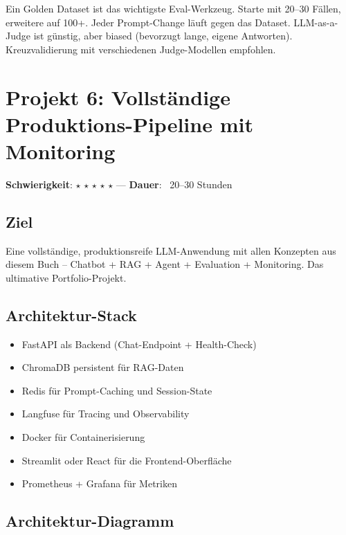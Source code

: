 \begin{praxishinweis}
Ein Golden Dataset ist das wichtigste Eval-Werkzeug. Starte mit 20--30 Fällen, erweitere auf 100+. Jeder Prompt-Change läuft gegen das Dataset. LLM-as-a-Judge ist günstig, aber biased (bevorzugt lange, eigene Antworten). Kreuzvalidierung mit verschiedenen Judge-Modellen empfohlen.
\end{praxishinweis}

\section{Projekt 6: Vollständige Produktions-Pipeline mit Monitoring}

\textbf{Schwierigkeit}: $\star$ $\star$ $\star$ $\star$ $\star$ ---
\textbf{Dauer}: ~20--30 Stunden

\subsection*{Ziel}
Eine vollständige, produktionsreife LLM-Anwendung mit allen Konzepten aus diesem Buch -- Chatbot + RAG + Agent + Evaluation + Monitoring. Das ultimative Portfolio-Projekt.

\subsection*{Architektur-Stack}
\begin{itemize}[leftmargin=*]
    \item FastAPI als Backend (Chat-Endpoint + Health-Check)
    \item ChromaDB persistent für RAG-Daten
    \item Redis für Prompt-Caching und Session-State
    \item Langfuse für Tracing und Observability
    \item Docker für Containerisierung
    \item Streamlit oder React für die Frontend-Oberfläche
    \item Prometheus + Grafana für Metriken
\end{itemize}

\subsection*{Architektur-Diagramm}

